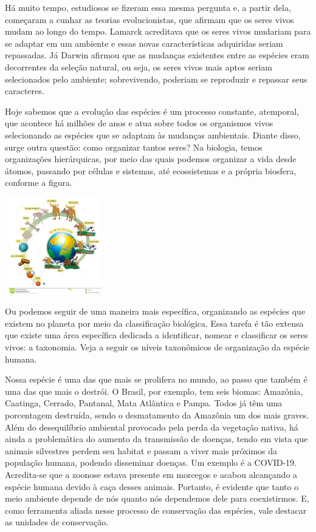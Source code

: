 {{Há muito tempo, estudiosos se fizeram essa mesma pergunta e, a partir dela,
começaram a cunhar as teorias evolucionistas, que afirmam que os seres
vivos mudam ao longo do tempo. Lamarck acreditava que os seres vivos
mudariam para se adaptar em um ambiente e essas novas características
adquiridas seriam repassadas. Já Darwin afirmou que as mudanças
existentes entre as espécies eram decorrentes da seleção natural, ou
seja, os seres vivos mais aptos seriam selecionados pelo ambiente;
sobrevivendo, poderiam se reproduzir e repassar seus caracteres.

Hoje
sabemos que a evolução das espécies é um processo constante, atemporal, que
acontece há milhões de anos e atua sobre todos os organismos vivos
selecionando as espécies que se adaptam às mudanças ambientais. Diante
disso, surge outra questão: como organizar tantos seres? Na
biologia, temos organizações hierárquicas, por meio das quais podemos organizar a
vida desde átomos, passando por células e sistemas, até ecossistemas e a própria biosfera, conforme a figura.


\includegraphics[width=1.71875in,height=1.66389in]{./imgs/img9.jpg}

Ou podemos seguir de uma maneira mais específica, organizando as
espécies que existem no planeta por meio da classificação biológica.
Essa tarefa é tão extensa que existe uma área específica dedicada a
identificar, nomear e classificar os seres vivos: a taxonomia. Veja a
seguir os níveis taxonômicos de organização da espécie humana.

Nossa espécie é uma das que mais se prolifera no mundo, ao passo que
também é uma das que mais o destrói. O Brasil, por exemplo, tem seis biomas: Amazônia, Caatinga, Cerrado, Pantanal, Mata Atlântica e Pampa. Todos
já têm uma porcentagem destruída, sendo o desmatamento da Amazônia um
dos mais graves. Além do desequilíbrio ambiental provocado pela perda da
vegetação nativa, há ainda a problemática do aumento da transmissão de
doenças, tendo em vista que animais silvestres perdem seu habitat e
passam a viver mais próximos da população humana, podendo disseminar
doenças. Um exemplo é a COVID-19. Acredita-se que a zoonose estava
presente em morcegos e acabou alcançando a espécie humana devido à caça
desses animais. Portanto, é evidente que tanto o meio ambiente depende
de nós quanto nós dependemos dele para coexistirmos. E, como ferramenta
aliada nesse processo de conservação das espécies, vale destacar as
unidades de conservação.}

}
